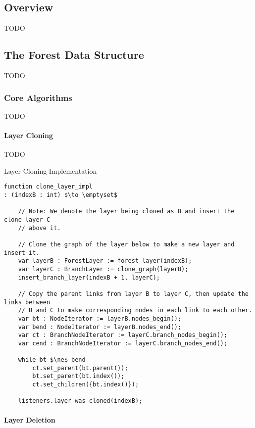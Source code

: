 \subsection{Overview}

TODO

\subsection{The Forest Data Structure}

TODO

\subsubsection{Core Algorithms}

TODO

\paragraph{Layer Cloning}

TODO

\begin{stulisting}[p]
\caption{Layer Cloning Implementation}
\label{code:ipfs-forest-clonelayerimpl}
\begin{lstlisting}[style=Default]
function clone_layer_impl
: (indexB : int) $\to \emptyset$

	// Note: We denote the layer being cloned as B and insert the clone layer C
	// above it.

	// Clone the graph of the layer below to make a new layer and insert it.
	var layerB : ForestLayer := forest_layer(indexB);
	var layerC : BranchLayer := clone_graph(layerB);
	insert_branch_layer(indexB + 1, layerC);

	// Copy the parent links from layer B to layer C, then update the links between
	// B and C to make corresponding nodes in each link to each other.
	var bt : NodeIterator := layerB.nodes_begin();
	var bend : NodeIterator := layerB.nodes_end();
	var ct : BranchNodeIterator := layerC.branch_nodes_begin();
	var cend : BranchNodeIterator := layerC.branch_nodes_end();

	while bt $\ne$ bend
		ct.set_parent(bt.parent());
		bt.set_parent(bt.index());
		ct.set_children({bt.index()});

	listeners.layer_was_cloned(indexB);
\end{lstlisting}
\end{stulisting}

\paragraph{Layer Deletion}

